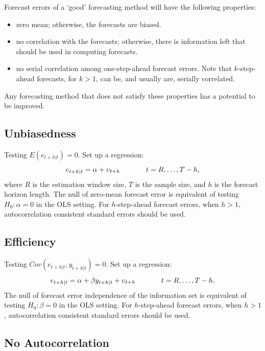 \documentclass[
  12pt,
  oneside]{book}
\providecommand{\tightlist}{%
  \setlength{\itemsep}{0pt}\setlength{\parskip}{0pt}}
\begin{document}
Forecast errors of a `good' forecasting method will have the following properties:

\begin{itemize}
\tightlist
\item
  zero mean; otherwise, the forecasts are biased.
\item
  no correlation with the forecasts; otherwise, there is information left that should be used in computing forecasts.
\item
  no serial correlation among one-step-ahead forecast errors. Note that \(k\)-step-ahead forecasts, for \(k>1\), can be, and usually are, serially correlated.
\end{itemize}

Any forecasting method that does not satisfy these properties has a potential to be improved.

\hypertarget{unbiasedness}{%
\subsection{Unbiasedness}\label{unbiasedness}}

Testing \(E(e_{t+h|t})=0\). Set up a regression: \[e_{t+h|t} = \alpha+\upsilon_{t+h} \hspace{.5in} t = R,\ldots,T-h,\]
where \(R\) is the estimation window size, \(T\) is the sample size, and \(h\) is the forecast horizon length. The null of zero-mean forecast error is equivalent of testing \(H_0: \alpha = 0\) in the OLS setting. For \(h\)-step-ahead forecast errors, when \(h>1\), autocorrelation consistent standard errors should be used.

\hypertarget{efficiency}{%
\subsection{Efficiency}\label{efficiency}}

Testing \(Cov(e_{t+h|t},y_{t+h|t})=0\). Set up a regression: \[e_{t+h|t} = \alpha + \beta y_{t+h|t} + \upsilon_{t+h} \hspace{.5in} t = R,\ldots,T-h.\] The null of forecast error independence of the information set is equivalent of testing \(H_0: \beta = 0\) in the OLS setting. For \(h\)-step-ahead forecast errors, when \(h>1\), autocorrelation consistent standard errors should be used.

\hypertarget{no-autocorrelation}{%
\subsection{No Autocorrelation}\label{no-autocorrelation}}
\end{document}
